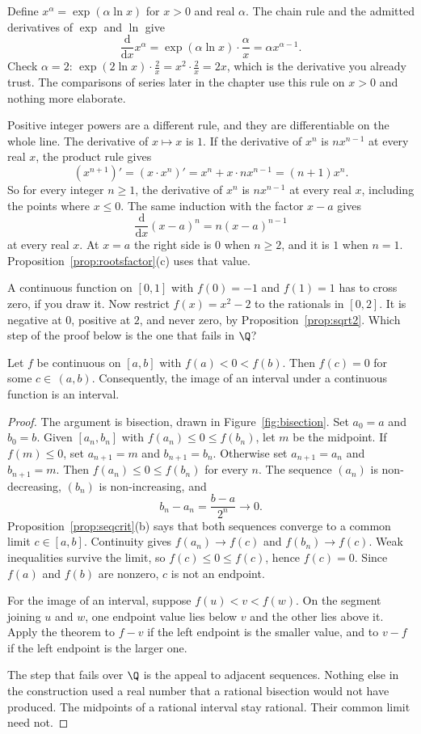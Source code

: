 Define $x^\alpha=\exp(\alpha\ln x)$ for $x>0$ and real $\alpha$. The chain rule and the admitted derivatives of $\exp$ and $\ln$ give
\[
\frac{\mathrm d}{\mathrm dx}x^\alpha=\exp(\alpha\ln x)\cdot\frac\alpha x=\alpha x^{\alpha-1}.
\]
Check $\alpha=2$: $\exp(2\ln x)\cdot\frac2x=x^2\cdot\frac2x=2x$, which is the derivative you already trust. The comparisons of series later in the chapter use this rule on $x>0$ and nothing more elaborate.

Positive integer powers are a different rule, and they are differentiable on the whole line. The derivative of $x\mapsto x$ is $1$. If the derivative of $x^n$ is $nx^{n-1}$ at every real $x$, the product rule gives
\[
(x^{n+1})'=(x\cdot x^n)'=x^n+x\cdot n x^{n-1}=(n+1)x^n.
\]
So for every integer $n\ge 1$, the derivative of $x^n$ is $nx^{n-1}$ at every real $x$, including the points where $x\le 0$. The same induction with the factor $x-a$ gives
\[
\frac{\mathrm d}{\mathrm dx}(x-a)^n=n(x-a)^{n-1}
\]
at every real $x$. At $x=a$ the right side is $0$ when $n\ge 2$, and it is $1$ when $n=1$. Proposition~\ref{prop:rootsfactor}(c) uses that value.

\begin{think}
A continuous function on $[0,1]$ with $f(0)=-1$ and $f(1)=1$ has to cross zero, if you draw it. Now restrict $f(x)=x^2-2$ to the rationals in $[0,2]$. It is negative at $0$, positive at $2$, and never zero, by Proposition~\ref{prop:sqrt2}. Which step of the proof below is the one that fails in $\Q$?
\end{think}

\begin{theorem}\label{thm:ivt}
Let $f$ be continuous on $[a,b]$ with $f(a)<0<f(b)$. Then $f(c)=0$ for some $c\in\,(a,b)$. Consequently, the image of an interval under a continuous function is an interval.
\end{theorem}
\begin{proof}
The argument is bisection, drawn in Figure~\ref{fig:bisection}. Set $a_0=a$ and $b_0=b$. Given $[a_n,b_n]$ with $f(a_n)\le0\le f(b_n)$, let $m$ be the midpoint. If $f(m)\le0$, set $a_{n+1}=m$ and $b_{n+1}=b_n$. Otherwise set $a_{n+1}=a_n$ and $b_{n+1}=m$. Then $f(a_n)\le0\le f(b_n)$ for every $n$. The sequence $(a_n)$ is non-decreasing, $(b_n)$ is non-increasing, and
\[
b_n-a_n=\frac{b-a}{2^n}\to0.
\]
Proposition~\ref{prop:seqcrit}(b) says that both sequences converge to a common limit $c\in[a,b]$. Continuity gives $f(a_n)\to f(c)$ and $f(b_n)\to f(c)$. Weak inequalities survive the limit, so $f(c)\le0\le f(c)$, hence $f(c)=0$. Since $f(a)$ and $f(b)$ are nonzero, $c$ is not an endpoint.

For the image of an interval, suppose $f(u)<v<f(w)$. On the segment joining $u$ and $w$, one endpoint value lies below $v$ and the other lies above it. Apply the theorem to $f-v$ if the left endpoint is the smaller value, and to $v-f$ if the left endpoint is the larger one.

The step that fails over $\Q$ is the appeal to adjacent sequences. Nothing else in the construction used a real number that a rational bisection would not have produced. The midpoints of a rational interval stay rational. Their common limit need not.
\end{proof}

